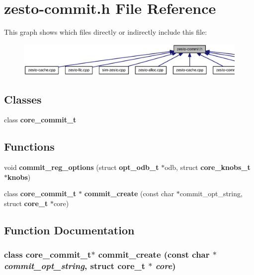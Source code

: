 \section{zesto-commit.h File Reference}
\label{zesto-commit_8h}


This graph shows which files directly or indirectly include this file:\nopagebreak
\begin{figure}[H]
\begin{center}
\leavevmode
\includegraphics[width=420pt]{zesto-commit_8h__dep__incl}
\end{center}
\end{figure}
\subsection*{Classes}
\begin{CompactItemize}
\item 
class {\bf core\_\-commit\_\-t}
\end{CompactItemize}
\subsection*{Functions}
\begin{CompactItemize}
\item 
void {\bf commit\_\-reg\_\-options} (struct {\bf opt\_\-odb\_\-t} $\ast$odb, struct {\bf core\_\-knobs\_\-t} $\ast${\bf knobs})
\item 
class {\bf core\_\-commit\_\-t} $\ast$ {\bf commit\_\-create} (const char $\ast$commit\_\-opt\_\-string, struct {\bf core\_\-t} $\ast$core)
\end{CompactItemize}


\subsection{Function Documentation}
\subsubsection[{commit\_\-create}]{\setlength{\rightskip}{0pt plus 5cm}class {\bf core\_\-commit\_\-t}$\ast$ commit\_\-create (const char $\ast$ {\em commit\_\-opt\_\-string}, \/  struct {\bf core\_\-t} $\ast$ {\em core})}\label{zesto-commit_8h_6dec1ee8a7d324bb5e49bd7246608c52}




